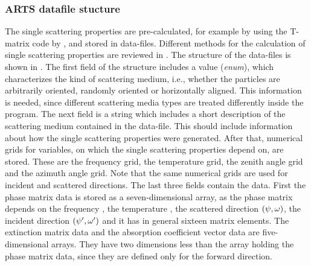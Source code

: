 \subsubsection{ARTS datafile stucture}
\label{sec:scattering:ARTS_SSP_structure}

The single scattering properties are pre-calculated, for example by using the T-matrix
code by \citet{Mishchenko:02}, and stored in data-files. Different
methods for the calculation of single scattering properties are
reviewed in \citet{emde05:_phdthesis}. The structure of the data-files is
shown in .  The first field of the
structure includes a value (\emph{enum}), which characterizes the kind
of scattering medium, i.e., whether the particles are arbitrarily
oriented, randomly oriented or horizontally aligned. This information
is needed, since different scattering media types are treated
differently inside the program. The next field is a string which
includes a short description of the scattering medium contained in the
data-file. This should include information about how the single
scattering properties were generated. After that, numerical grids for
variables, on which the single scattering properties depend on, are
stored. These are the frequency grid, the temperature grid, the zenith
angle grid and the azimuth angle grid. Note that the same numerical
grids are used for incident and scattered directions. The last three
fields contain the data. First the phase matrix data is stored as a
seven-dimensional array, as the phase matrix depends on the frequency
\Frq, the temperature \Tmp, the scattered direction $(\psi,
\omega)$, the incident direction $(\psi', \omega')$ and it
has in general sixteen matrix elements. The extinction matrix data and
the absorption coefficient vector data are five-dimensional arrays.
They have two dimensions less than the array holding the phase matrix
data, since they are defined only for the forward direction.

